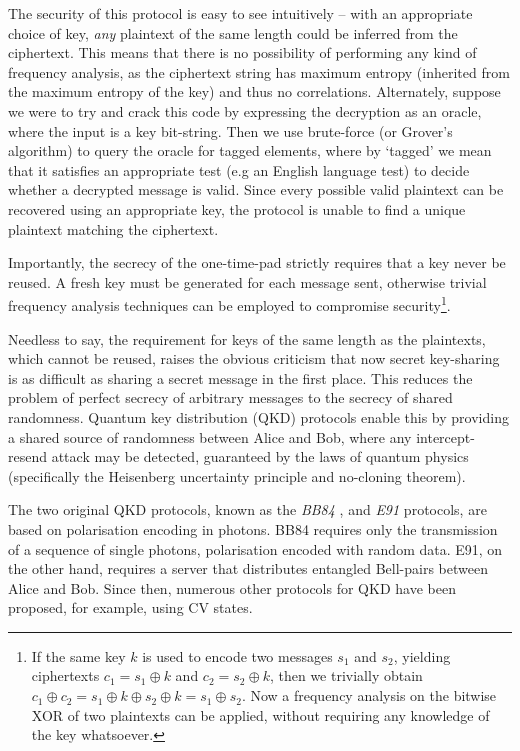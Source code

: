 \documentclass[aps,rmp,twocolumn,amsmath,amssymb,nofootinbib,superscriptaddress,longbibliography,floatfix,table-of-contents,eqsecnum]{revtex4-1}
\begin{document}
The security of this protocol is easy to see intuitively -- with an appropriate choice of key, \textit{any} plaintext of the same length could be inferred from the ciphertext. This means that there is no possibility of performing any kind of frequency analysis, as the ciphertext string has maximum entropy (inherited from the maximum entropy of the key) and thus no correlations. Alternately, suppose we were to try and crack this code by expressing the decryption as an oracle, where the input is a key bit-string. Then we use brute-force (or Grover's algorithm) to query the oracle for tagged elements, where by `tagged' we mean that it satisfies an appropriate test (e.g an English language test) to decide whether a decrypted message is valid. Since every possible valid plaintext can be recovered using an appropriate key, the protocol is unable to find a unique plaintext matching the ciphertext.

Importantly, the secrecy of the one-time-pad strictly requires that a key never be reused. A fresh key must be generated for each message sent, otherwise trivial frequency analysis techniques can be employed to compromise security\footnote{If the same key $k$ is used to encode two messages $s_1$ and $s_2$, yielding ciphertexts \mbox{$c_1=s_1\oplus k$} and \mbox{$c_2=s_2\oplus k$}, then we trivially obtain \mbox{$c_1 \oplus c_2 = s_1 \oplus k \oplus s_2 \oplus k = s_1 \oplus s_2$}. Now a frequency analysis on the bitwise XOR of two plaintexts can be applied, without requiring any knowledge of the key whatsoever.}.

Needless to say, the requirement for keys of the same length as the plaintexts, which cannot be reused, raises the obvious criticism that now secret key-sharing is as difficult as sharing a secret message in the first place. This reduces the problem of perfect secrecy of arbitrary messages to the secrecy of shared randomness. Quantum key distribution (QKD) protocols enable this by providing a shared source of randomness between Alice and Bob, where any intercept-resend attack may be detected, guaranteed by the laws of quantum physics (specifically the Heisenberg uncertainty principle and no-cloning theorem).

The two original QKD protocols, known as the \textit{BB84} \cite{bib:BennetBrassard84}, and \textit{E91} \cite{bib:Ekert91} protocols, are based on polarisation encoding in photons. BB84 requires only the transmission of a sequence of single photons, polarisation encoded with random data. E91, on the other hand, requires a server that distributes entangled Bell-pairs between Alice and Bob. Since then, numerous other protocols for QKD have been proposed, for example, using CV states.
\end{document}
